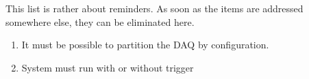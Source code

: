 This list is rather about reminders. As soon as the items are addressed somewhere else,
they can be eliminated here.
\begin{enumerate}
\item It must be possible to partition the DAQ by configuration.
\item System must run with or without trigger
\end{enumerate}
